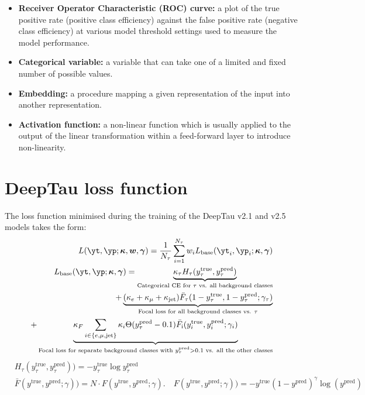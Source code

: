 \begin{itemize}
    \item[] \textbf{Receiver Operator Characteristic (ROC) curve:} a plot of the true positive rate (positive class efficiency) against the false positive rate (negative class efficiency) at various model threshold settings used to measure the model performance.

    \item[] \textbf{Categorical variable:} a variable that can take one of a limited and fixed number of possible values.

    \item[] \textbf{Embedding:} a procedure mapping a given representation of the input into another representation. 
    
    \item[] \textbf{Activation function:} a non-linear function which is usually applied to the output of the linear transformation within a feed-forward layer to introduce non-linearity.     
\end{itemize}



\section{DeepTau loss function}\label{app:loss}
The loss function minimised during the training of the DeepTau v2.1 and v2.5 models takes the form:
\begin{align*}
    L(\yt, \yp; \boldsymbol{\kappa}, \boldsymbol{w}, \boldsymbol{\gamma}) = \dfrac{1}{N_\tau}\sum_{i=1}^{N_\tau}w_i L_\text{base}(\yt_i, \yp_i; \boldsymbol{\kappa}, \boldsymbol{\gamma})\\
    L_\text{base}(\yt, \yp; \boldsymbol{\kappa}, \boldsymbol{\gamma}) = \underbrace{\kappa_\tau H_\tau(y_\tau^\text{true}, y_\tau^\text{pred})}_{\text{Categorical CE for }\tau \text{ vs. all background classes}}\\
    + \underbrace{(\kappa_e + \kappa_\mu + \kappa_\text{jet})\bar{F}_\tau(1-y_\tau^\text{true}, 1-y_\tau^\text{pred}; \gamma_\tau)}_{\text{Focal loss for all background classes vs. } \tau} \\ %
    + \underbrace{\kappa_F\sum_{i \in \{e, \mu, \text{jet}\}}\kappa_i \Theta(y_\tau^\text{pred} - 0.1)\bar{F}_\text{i}(y_i^\text{true}, y_i^\text{pred}; \gamma_i)}_{\text{Focal loss for separate background classes with } y_\tau^\text{pred} > 0.1 \text{ vs. all the other classes}}\\
\end{align*}
\begin{align*}
    &H_\tau(y_\tau^\text{true}, y_\tau^\text{pred})) = -y_\tau^\text{true} \log y_\tau^\text{pred}\\
    &\bar{F}(y^\text{true}, y^\text{pred}; \gamma)) = N \cdot F(y^\text{true}, y^\text{pred}; \gamma). \quad F(y^\text{true}, y^\text{pred}; \gamma)) = - y^\text{true} (1-y^\text{pred})^\gamma \log(y^\text{pred})\\
\end{align*}

